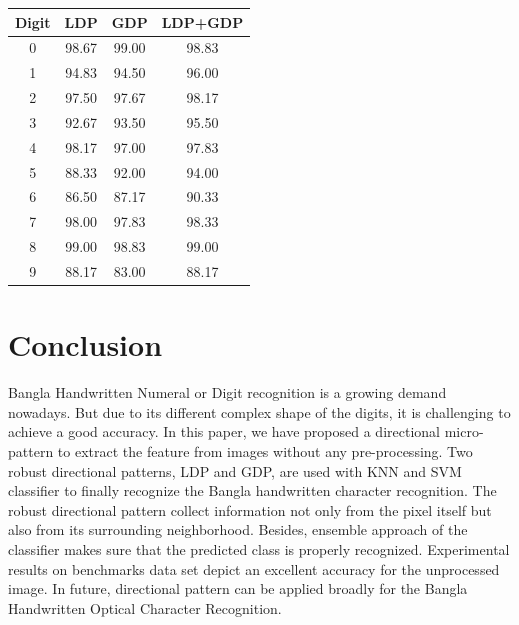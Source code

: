 \documentclass[conference]{IEEEtran}
\begin{document}
\begin{center}
	\label{table_LDP+GDP}
	\begin{tabular}{cccc}
		\hline
		Digit & LDP & GDP & LDP+GDP \\
		\hline
		0 & 98.67 & 99.00 & 98.83\\
		1 & 94.83 & 94.50 & 96.00\\
		2 & 97.50 & 97.67 & 98.17\\
		3 & 92.67 & 93.50 & 95.50\\
		4 & 98.17 & 97.00 & 97.83\\
		5 & 88.33 & 92.00 & 94.00\\
		6 & 86.50 & 87.17 & 90.33\\
		7 & 98.00 & 97.83 & 98.33\\
		8 & 99.00 & 98.83 & 99.00\\
		9 & 88.17 & 83.00 & 88.17\\
		\hline
	\end{tabular}
\end{center}

\section{Conclusion}
Bangla Handwritten Numeral or Digit recognition is a growing demand nowadays. But due to its different complex shape of the digits, it is challenging to achieve a good accuracy. In this paper, we have proposed a directional micro-pattern to extract the feature from images without any pre-processing. Two robust directional patterns, LDP and GDP, are used with KNN and SVM classifier to finally recognize the Bangla handwritten character recognition. The robust directional pattern collect information not only from the pixel itself but also from its surrounding neighborhood. Besides, ensemble approach of the classifier makes sure that the predicted class is properly recognized. Experimental results on benchmarks data set depict an excellent accuracy for the unprocessed image. In future, directional pattern can be applied broadly for the Bangla Handwritten Optical Character Recognition.




\end{document}

